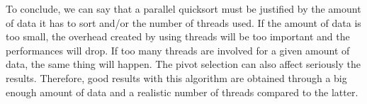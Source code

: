 To conclude, we can say that a parallel quicksort must be justified by the amount of data it has to sort and/or the number of threads used. If the amount of data is too small, the overhead created by using threads will be too important and the performances will drop. If too many threads are involved for a given amount of data, the same thing will happen. The pivot selection can also affect seriously the results. Therefore, good results with this algorithm are obtained through a big enough amount of data and a realistic number of threads compared to the latter.
